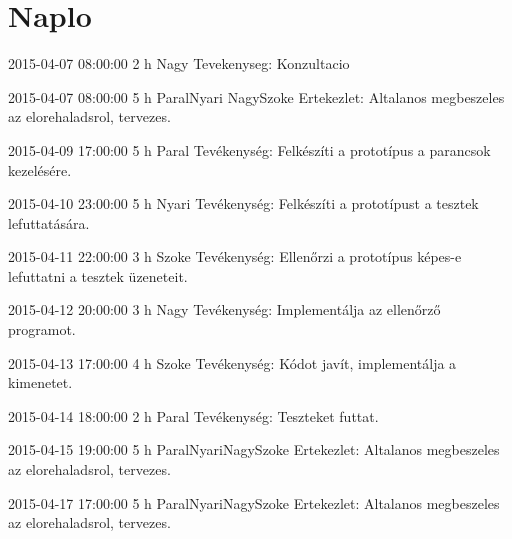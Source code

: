 \section{Naplo}
\begin{naplo}

            
            \bejegyzes
{2015-04-07 08:00:00}
            {2 h}
            {Nagy}
            {Tevekenyseg: Konzultacio}

            \bejegyzes
{2015-04-07 08:00:00}
            {5 h}
            {Paral\newline  Nyari \newline Nagy\newline Szoke}
            {Ertekezlet: Altalanos megbeszeles az elorehaladsrol, tervezes.}

            \bejegyzes
{2015-04-09 17:00:00}
            {5 h}
            {Paral}
            {Tevékenység: Felkészíti a prototípus a parancsok kezelésére.}

            \bejegyzes
{2015-04-10 23:00:00}
            {5 h}
            {Nyari}
            {Tevékenység: Felkészíti a prototípust a tesztek lefuttatására.}

            \bejegyzes
{2015-04-11 22:00:00}
            {3 h}
            {Szoke}
            {Tevékenység: Ellenőrzi a prototípus képes-e lefuttatni a tesztek üzeneteit.}

            \bejegyzes
{2015-04-12 20:00:00}
            {3 h}
            {Nagy}
            {Tevékenység: Implementálja az ellenőrző programot.}

            \bejegyzes
{2015-04-13 17:00:00}
            {4 h}
            {Szoke}
            {Tevékenység: Kódot javít, implementálja a kimenetet.}

            \bejegyzes
{2015-04-14 18:00:00}
            {2 h}
            {Paral}
            {Tevékenység: Teszteket futtat.}

            \bejegyzes
{2015-04-15 19:00:00}
            {5 h}
            {Paral\newline Nyari\newline Nagy\newline Szoke}
            {Ertekezlet: Altalanos megbeszeles az elorehaladsrol, tervezes.}

            \bejegyzes
{2015-04-17 17:00:00}
            {5 h}
            {Paral\newline Nyari\newline Nagy\newline Szoke}
            {Ertekezlet: Altalanos megbeszeles az elorehaladsrol, tervezes.}


\end{naplo}
